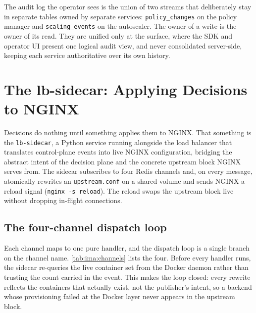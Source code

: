 The audit log the operator sees is the union of two streams that deliberately stay
in separate tables owned by separate services: \texttt{policy\_changes} on the
policy manager and \texttt{scaling\_events} on the autoscaler. The owner of a write
is the owner of its read. They are unified only at the surface, where the SDK and
operator UI present one logical audit view, and never consolidated server-side,
keeping each service authoritative over its own history.

\section{The lb-sidecar: Applying Decisions to NGINX}
\label{sec:ima:sidecar}

Decisions do nothing until something applies them to NGINX. That something is the
\texttt{lb-sidecar}, a Python service running alongside the load balancer that
translates control-plane events into live NGINX configuration, bridging the
abstract intent of the decision plane and the concrete upstream block NGINX serves
from. The sidecar subscribes to four Redis channels and, on every message,
atomically rewrites an \texttt{upstream.conf} on a shared volume and sends NGINX a
reload signal (\texttt{nginx -s reload}). The reload swaps the upstream block live
without dropping in-flight connections.

\subsection{The four-channel dispatch loop}
\label{sec:ima:dispatch}

Each channel maps to one pure handler, and the dispatch loop is a single branch
on the channel name. \cref{tab:ima:channels} lists the four. Before every handler
runs, the sidecar re-queries the live container set from the Docker daemon rather
than trusting the count carried in the event. This makes the loop closed: every
rewrite reflects the containers that actually exist, not the publisher's intent,
so a backend whose provisioning failed at the Docker layer never appears in the
upstream block.

